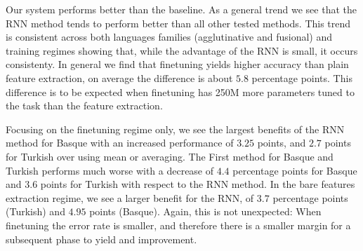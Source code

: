 \documentclass[11pt]{article}
\newcommand\jp[1]{(\textbf{JP:} #1)}
\begin{document}
                Our system performs better than the baseline. As a
     general trend we see that the RNN method tends to perform better
     than all other tested methods. This trend is consistent across
     both languages families (agglutinative and fusional) and
     training regimes showing that, while the advantage of the RNN is
     small, it occurs consistenty.
        In general we find that finetuning yields higher accuracy than
        plain feature extraction, on average the difference is about $5.8$
        percentage points.  This difference is to be expected when
        finetuning has 250M more parameters tuned to the task than the
        feature extraction. %
    
                Focusing on the finetuning regime only, we see the
     largest benefits of the RNN method for Basque with an increased
     performance of $3.25$ points, and $2.7$ points for Turkish over
     using mean or averaging. The First method for Basque and Turkish
     performs much worse with a decrease of $4.4$ percentage points
     for Basque and $3.6$ points for Turkish with respect to the RNN method.
        In the bare features extraction regime, we see a larger
     benefit for the RNN, of $3.7$ percentage points (Turkish) and
     $4.95$ points (Basque). Again, this is not unexpected: When
     finetuning the error rate is smaller, and therefore there is a
     smaller margin for a subsequent phase to yield and improvement.
    

    
\end{document}
